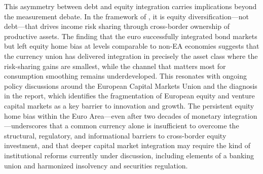 \documentclass{article}
\begin{document}
This asymmetry between debt and equity integration carries implications 
beyond the measurement debate. In the framework of \cite{sorensen2007}, 
it is equity diversification---not debt---that drives income risk sharing 
through cross-border ownership of productive assets. The finding that 
the euro successfully integrated bond markets but left equity home bias 
at levels comparable to non-EA economies suggests that the currency 
union has delivered integration in precisely the asset class where the 
risk-sharing gains are smallest, while the channel that matters most 
for consumption smoothing remains underdeveloped. This resonates with 
ongoing policy discussions around the European Capital Markets Union 
and the diagnosis in the \cite{draghi2024} report, which identifies 
the fragmentation of European equity and venture capital markets as a 
key barrier to innovation and growth. The persistent equity home bias 
within the Euro Area---even after two decades of monetary 
integration---underscores that a common currency alone is insufficient 
to overcome the structural, regulatory, and informational barriers to 
cross-border equity investment, and that deeper capital market 
integration may require the kind of institutional reforms currently 
under discussion, including elements of a banking union and harmonized 
insolvency and securities regulation.
\end{document}

